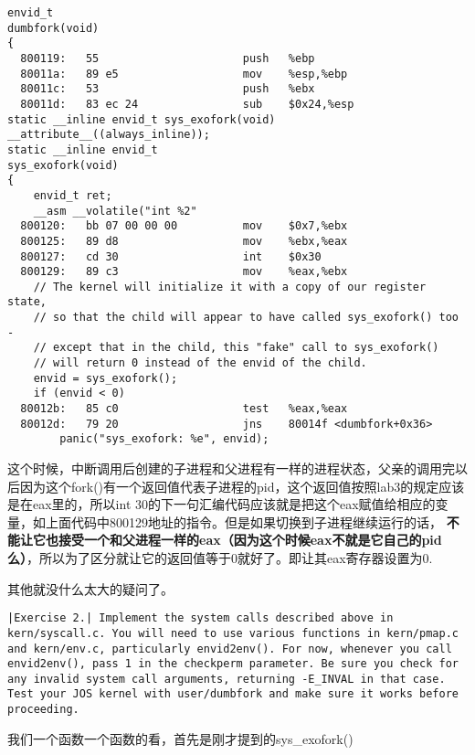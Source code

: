 \documentclass{article}
\newcommand{\highlight}[1]{{\bfseries \color{red}  #1}}
\newcommand{\funcname}[1]{{\ttfamily \small #1}}
\begin{document}
\begin{CJK*}{UTF8}{gkai}
\begin{lstlisting}[style=acode, firstnumber=118, title={\scriptsize \ttfamily \bfseries obj/user/dumbfork.asm}]
envid_t
dumbfork(void)
{
  800119:	55                   	push   %ebp
  80011a:	89 e5                	mov    %esp,%ebp
  80011c:	53                   	push   %ebx
  80011d:	83 ec 24             	sub    $0x24,%esp
static __inline envid_t sys_exofork(void) __attribute__((always_inline));
static __inline envid_t
sys_exofork(void)
{
	envid_t ret;
	__asm __volatile("int %2"
  800120:	bb 07 00 00 00       	mov    $0x7,%ebx
  800125:	89 d8                	mov    %ebx,%eax
  800127:	cd 30                	int    $0x30
  800129:	89 c3                	mov    %eax,%ebx
	// The kernel will initialize it with a copy of our register state,
	// so that the child will appear to have called sys_exofork() too -
	// except that in the child, this "fake" call to sys_exofork()
	// will return 0 instead of the envid of the child.
	envid = sys_exofork();
	if (envid < 0)
  80012b:	85 c0                	test   %eax,%eax
  80012d:	79 20                	jns    80014f <dumbfork+0x36>
		panic("sys_exofork: %e", envid);
\end{lstlisting}

这个时候，中断调用后创建的子进程和父进程有一样的进程状态，父亲的调用完以后因为这个\funcname{fork()}有一个返回值代表子进程的pid，这个返回值按照lab3的规定应该是在eax里的，所以int 30的下一句汇编代码应该就是把这个eax赋值给相应的变量，如上面代码中800129地址的指令。但是如果切换到子进程继续运行的话，\highlight{不能让它也接受一个和父进程一样的eax（因为这个时候eax不就是它自己的pid么）}，所以为了区分就让它的返回值等于0就好了。即让其eax寄存器设置为0.

其他就没什么太大的疑问了。

\vspace{2em}

\begin{lstlisting}[style=exercise]
|Exercise 2.| Implement the system calls described above in kern/syscall.c. You will need to use various functions in kern/pmap.c and kern/env.c, particularly envid2env(). For now, whenever you call envid2env(), pass 1 in the checkperm parameter. Be sure you check for any invalid system call arguments, returning -E_INVAL in that case. Test your JOS kernel with user/dumbfork and make sure it works before proceeding.
\end{lstlisting}

我们一个函数一个函数的看，首先是刚才提到的\funcname{sys\_exofork()}


\end{CJK*}
\end{document}
